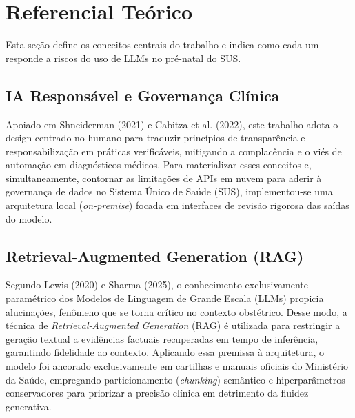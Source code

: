 \documentclass[12pt]{article}
\begin{document}
\section{Referencial Teórico}

Esta seção define os conceitos centrais do trabalho e indica como cada um responde a riscos do uso de LLMs no pré-natal do SUS.

\subsection{IA Responsável e Governança Clínica}
Apoiado em Shneiderman (2021) e Cabitza et al. (2022), este trabalho adota o design centrado no humano para traduzir princípios de transparência e responsabilização em práticas verificáveis, mitigando a complacência e o viés de automação em diagnósticos médicos. Para materializar esses conceitos e, simultaneamente, contornar as limitações de APIs em nuvem para aderir à governança de dados no Sistema Único de Saúde (SUS), implementou-se uma arquitetura local (\textit{on-premise}) focada em interfaces de revisão rigorosa das saídas do modelo.

\subsection{Retrieval-Augmented Generation (RAG)}
Segundo Lewis (2020) e Sharma (2025), o conhecimento exclusivamente paramétrico dos Modelos de Linguagem de Grande Escala (LLMs) propicia alucinações, fenômeno que se torna crítico no contexto obstétrico. Desse modo, a técnica de \textit{Retrieval-Augmented Generation} (RAG) é utilizada para restringir a geração textual a evidências factuais recuperadas em tempo de inferência, garantindo fidelidade ao contexto. Aplicando essa premissa à arquitetura, o modelo foi ancorado exclusivamente em cartilhas e manuais oficiais do Ministério da Saúde, empregando particionamento (\textit{chunking}) semântico e hiperparâmetros conservadores para priorizar a precisão clínica em detrimento da fluidez generativa.
\end{document}
